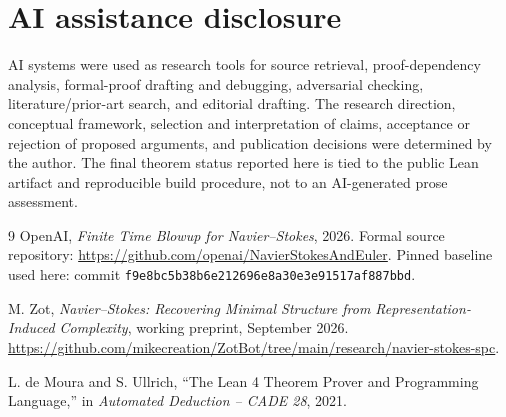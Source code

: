\documentclass[11pt]{article}
\theoremstyle{highend}
\theoremstyle{definition}
\begin{document}
\section{AI assistance disclosure}
AI systems were used as research tools for source retrieval, proof-dependency analysis, formal-proof drafting and debugging, adversarial checking, literature/prior-art search, and editorial drafting. The research direction, conceptual framework, selection and interpretation of claims, acceptance or rejection of proposed arguments, and publication decisions were determined by the author. The final theorem status reported here is tied to the public Lean artifact and reproducible build procedure, not to an AI-generated prose assessment.

\begin{thebibliography}{9}
OpenAI, \emph{Finite Time Blowup for Navier--Stokes}, 2026. Formal source repository: \url{https://github.com/openai/NavierStokesAndEuler}. Pinned baseline used here: commit \texttt{f9e8bc5b38b6e212696e8a30e3e91517af887bbd}.

M. Zot, \emph{Navier--Stokes: Recovering Minimal Structure from Representation-Induced Complexity}, working preprint, September 2026. \url{https://github.com/mikecreation/ZotBot/tree/main/research/navier-stokes-spc}.

L. de Moura and S. Ullrich, ``The Lean 4 Theorem Prover and Programming Language,'' in \emph{Automated Deduction -- CADE 28}, 2021.
\end{thebibliography}
\end{document}
